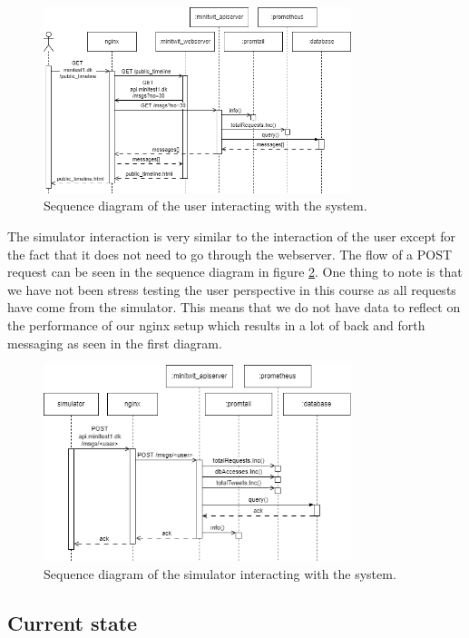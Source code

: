 \begin{figure}[H]
    \centering
    \includegraphics[width=0.8\textwidth]{images/sequence.png}
    \caption{Sequence diagram of the user interacting with the system.}
    \label{fig:user_sequence}
\end{figure}

The simulator interaction is very similar to the interaction of the user except for the fact that it does not need to go through the webserver. The flow of a POST request can be seen in the sequence diagram in figure \ref{fig:sim_sequence}. One thing to note is that we have not been stress testing the user perspective in this course as all requests have come from the simulator. This means that we do not have data to reflect on the performance of our nginx setup which results in a lot of back and forth messaging as seen in the first diagram. 

\begin{figure}[H]
    \centering
    \includegraphics[width=0.8\textwidth]{images/sequence-simulator.png}
    \caption{Sequence diagram of the simulator interacting with the system.}
    \label{fig:sim_sequence}
\end{figure}




\subsection{Current state}

